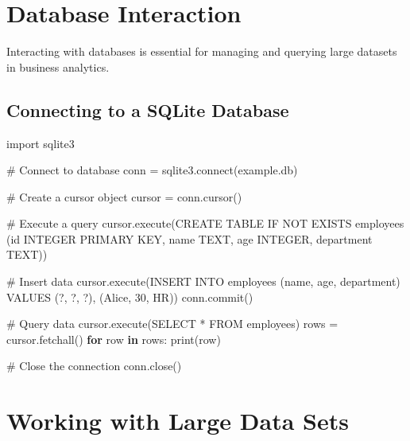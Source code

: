 \documentclass[
  letterpaper,
  DIV=11,
  numbers=noendperiod]{scrreprt}
\newenvironment{Shaded}{\begin{snugshade}}{\end{snugshade}}
\newcommand{\BuiltInTok}[1]{\textcolor[rgb]{0.00,0.23,0.31}{#1}}
\newcommand{\CommentTok}[1]{\textcolor[rgb]{0.37,0.37,0.37}{#1}}
\newcommand{\ControlFlowTok}[1]{\textcolor[rgb]{0.00,0.23,0.31}{\textbf{#1}}}
\newcommand{\DecValTok}[1]{\textcolor[rgb]{0.68,0.00,0.00}{#1}}
\newcommand{\ExtensionTok}[1]{\textcolor[rgb]{0.00,0.23,0.31}{#1}}
\newcommand{\ImportTok}[1]{\textcolor[rgb]{0.00,0.46,0.62}{#1}}
\newcommand{\KeywordTok}[1]{\textcolor[rgb]{0.00,0.23,0.31}{\textbf{#1}}}
\newcommand{\NormalTok}[1]{\textcolor[rgb]{0.00,0.23,0.31}{#1}}
\newcommand{\OperatorTok}[1]{\textcolor[rgb]{0.37,0.37,0.37}{#1}}
\newcommand{\StringTok}[1]{\textcolor[rgb]{0.13,0.47,0.30}{#1}}
\begin{document}
\section{Database Interaction}\label{database-interaction}

Interacting with databases is essential for managing and querying large
datasets in business analytics.

\subsection{Connecting to a SQLite
Database}\label{connecting-to-a-sqlite-database}

\begin{Shaded}
\begin{Highlighting}[]
\ImportTok{import}\NormalTok{ sqlite3}

\CommentTok{\# Connect to database}
\NormalTok{conn }\OperatorTok{=}\NormalTok{ sqlite3.}\ExtensionTok{connect}\NormalTok{(}\StringTok{\textquotesingle{}example.db\textquotesingle{}}\NormalTok{)}

\CommentTok{\# Create a cursor object}
\NormalTok{cursor }\OperatorTok{=}\NormalTok{ conn.cursor()}

\CommentTok{\# Execute a query}
\NormalTok{cursor.execute(}\StringTok{\textquotesingle{}CREATE TABLE IF NOT EXISTS employees (id INTEGER PRIMARY KEY, name TEXT, age INTEGER, department TEXT)\textquotesingle{}}\NormalTok{)}

\CommentTok{\# Insert data}
\NormalTok{cursor.execute(}\StringTok{\textquotesingle{}INSERT INTO employees (name, age, department) VALUES (?, ?, ?)\textquotesingle{}}\NormalTok{, (}\StringTok{\textquotesingle{}Alice\textquotesingle{}}\NormalTok{, }\DecValTok{30}\NormalTok{, }\StringTok{\textquotesingle{}HR\textquotesingle{}}\NormalTok{))}
\NormalTok{conn.commit()}

\CommentTok{\# Query data}
\NormalTok{cursor.execute(}\StringTok{\textquotesingle{}SELECT * FROM employees\textquotesingle{}}\NormalTok{)}
\NormalTok{rows }\OperatorTok{=}\NormalTok{ cursor.fetchall()}
\ControlFlowTok{for}\NormalTok{ row }\KeywordTok{in}\NormalTok{ rows:}
    \BuiltInTok{print}\NormalTok{(row)}

\CommentTok{\# Close the connection}
\NormalTok{conn.close()}
\end{Highlighting}
\end{Shaded}

\section{Working with Large Data
Sets}\label{working-with-large-data-sets}
\end{document}
